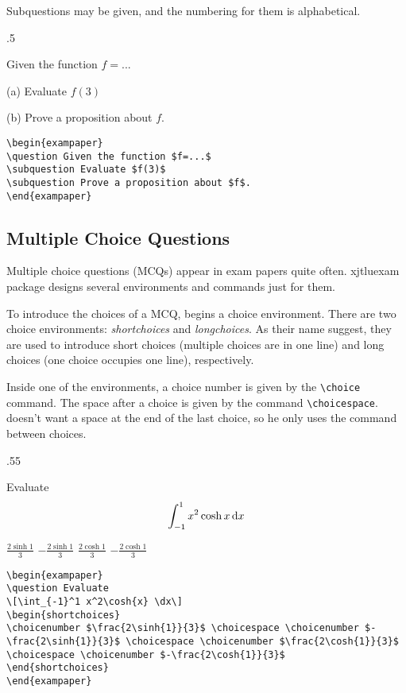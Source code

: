 Subquestions may be given, and the numbering for them is alphabetical.
\begin{miniexammar}{.5\textandmarginlen}{
\begin{exampaper}
\question Given the function $f=...$

\hspace{1.5em}(a) Evaluate $f(3)$

\hspace{1.5em}(b) Prove a proposition about $f$.
\end{exampaper}
}
\begin{lstlisting}
\begin{exampaper}
\question Given the function $f=...$
\subquestion Evaluate $f(3)$
\subquestion Prove a proposition about $f$.
\end{exampaper}
\end{lstlisting}
\end{miniexammar}

\subsection{Multiple Choice Questions}
Multiple choice questions (MCQs) appear in exam papers quite often. xjtluexam package designs several environments and commands just for them.

To introduce the choices of a MCQ, \raul{} begins a choice environment. There are two choice environments: \emph{shortchoices} and \emph{longchoices}. As their name suggest, they are used to introduce short choices (multiple choices are in one line) and long choices (one choice occupies one line), respectively.

Inside one of the environments, a choice number is given by the \verb=\choice= command. The space after a choice is given by the command \verb=\choicespace=. \raul{} doesn't want a space at the end of the last choice, so he only uses the command between choices.
\begin{miniexammar}{.55\textandmarginlen}{
\begin{exampaper}
\question Evaluate
\[
\int_{-1}^1 x^2\cosh{x} \,\mathrm{d} x
\]
\begin{shortchoices}
\choicenumber $\frac{2\sinh{1}}{3}$ \choicespace
\choicenumber $-\frac{2\sinh{1}}{3}$ \choicespace
\choicenumber $\frac{2\cosh{1}}{3}$ \choicespace
\choicenumber $-\frac{2\cosh{1}}{3}$ 
\end{shortchoices}
\end{exampaper}
}
\begin{lstlisting}
\begin{exampaper}
\question Evaluate
\[\int_{-1}^1 x^2\cosh{x} \dx\]
\begin{shortchoices}
\choicenumber $\frac{2\sinh{1}}{3}$ \choicespace \choicenumber $-\frac{2\sinh{1}}{3}$ \choicespace \choicenumber $\frac{2\cosh{1}}{3}$ \choicespace \choicenumber $-\frac{2\cosh{1}}{3}$ 
\end{shortchoices}
\end{exampaper}
\end{lstlisting}
\end{miniexammar}

